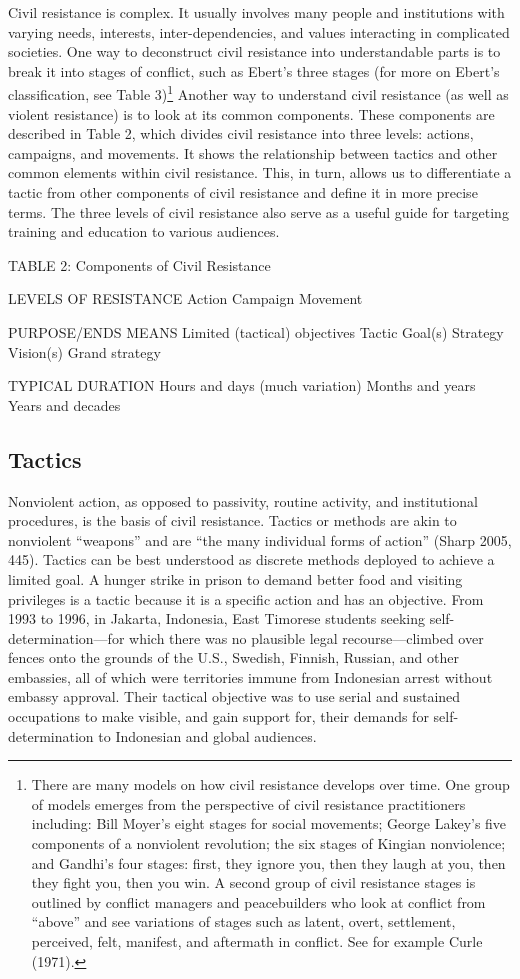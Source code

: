 \documentclass[twoside,a4paper,12pt,fleqn,openany]{extbook}
\begin{document}
Civil resistance is complex. It usually involves many people and institutions with varying needs, interests, inter-dependencies, and values interacting in complicated societies. One way to deconstruct civil resistance into understandable parts is to break it into stages of conflict, such as Ebert’s three stages (for more on Ebert’s classification, see Table 3)\footnote{There are many models on how civil resistance develops over time. One group of models emerges from the perspective of civil resistance practitioners including: Bill Moyer’s eight stages for social movements; George Lakey’s five components of a nonviolent revolution; the six stages of Kingian nonviolence; and Gandhi’s four stages: first, they ignore you, then they laugh at you, then they fight you, then you win. A second group of civil resistance stages is outlined by conflict managers and peacebuilders who look at conflict from “above” and see variations of stages such as latent, overt, settlement, perceived, felt, manifest, and aftermath in conflict. See for example Curle (1971).} Another way to understand civil resistance (as well as violent resistance) is to look at its common components. These components are described in Table 2, which divides civil resistance into three levels: actions, campaigns, and movements. It shows the relationship between tactics and other common elements within civil resistance. This, in turn, allows us to differentiate a tactic from other components of civil resistance and define it in more precise terms. The three levels of civil resistance also serve as a useful guide for targeting training and education to various audiences.

TABLE 2: Components of Civil Resistance

LEVELS OF RESISTANCE
Action
Campaign
Movement

PURPOSE/ENDS
MEANS
Limited (tactical) objectives
Tactic
Goal(s)
Strategy
Vision(s)
Grand strategy

TYPICAL DURATION
Hours and days (much variation)
Months and years
Years and decades

\subsection*{Tactics}

Nonviolent action, as opposed to passivity, routine activity, and institutional procedures, is the basis of civil resistance. Tactics or methods are akin to nonviolent “weapons” and are “the many individual forms of action” (Sharp 2005, 445). Tactics can be best understood as discrete methods deployed to achieve a limited goal. A hunger strike in prison to demand better food and visiting privileges is a tactic because it is a specific action and has an objective. From 1993 to 1996, in Jakarta, Indonesia, East Timorese students seeking self-determination—for which there was no plausible legal recourse—climbed over fences onto the grounds of the U.S., Swedish, Finnish, Russian, and other embassies, all of which were territories immune from Indonesian arrest without embassy approval. Their tactical objective was to use serial and sustained occupations to make visible, and gain support for, their demands for self-determination to Indonesian and global audiences.
\end{document}
